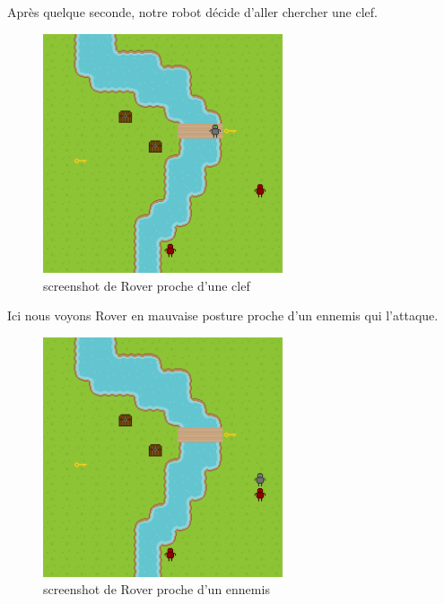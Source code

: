\documentclass[a4paper 12pts]{article}
\begin{document}
Après quelque seconde, notre robot décide d'aller chercher une clef.

\begin{figure}[h]
   \includegraphics[width=200pt]{Illustration/screens/screen2.png}
\caption{screenshot de Rover proche d'une clef}
\end{figure}

\newpage


Ici nous voyons Rover en mauvaise posture proche d'un ennemis qui l'attaque.

\vspace{1cm}

\begin{figure}[h]   
	\includegraphics[width=200pt]{Illustration/screens/screen3.png}
\caption{screenshot de Rover proche d'un ennemis}
\end{figure}
\end{document}
